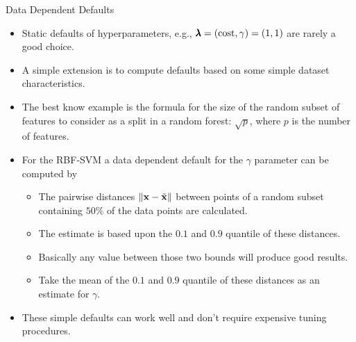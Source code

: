 \begin{frame}{Data Dependent Defaults}

    \begin{itemize}
            \item Static defaults of hyperparameters, e.g., $\pmb{\lambda} = (\text{cost},\gamma) = (1,1)$ are rarely a good choice.
            \item A simple extension is to compute defaults based on some simple dataset characteristics.
            \item The best know example is the formula for the size of the random subset of features to consider as a split in a random forest: $\sqrt{p}$, where $p$ is the number of features.
            \item For the RBF-SVM a data dependent default for the $\gamma$ parameter can be computed by
                \begin{itemize}
                     \item The pairwise distances $\|\mathbf{x} - \tilde {\mathbf{x}} \|$ between points of a random subset containing $50\%$ of the data points are calculated.
                     \item The estimate is based upon the $0.1$ and $0.9$ quantile of these distances.
                     \item Basically any value between those two bounds will produce good results.
                     \item Take the mean of the $0.1$ and $0.9$ quantile of these distances as an estimate for $\gamma$.
                \end{itemize}
            \item These simple defaults can work well and don't require expensive tuning procedures.
    \end{itemize}
\end{frame}


